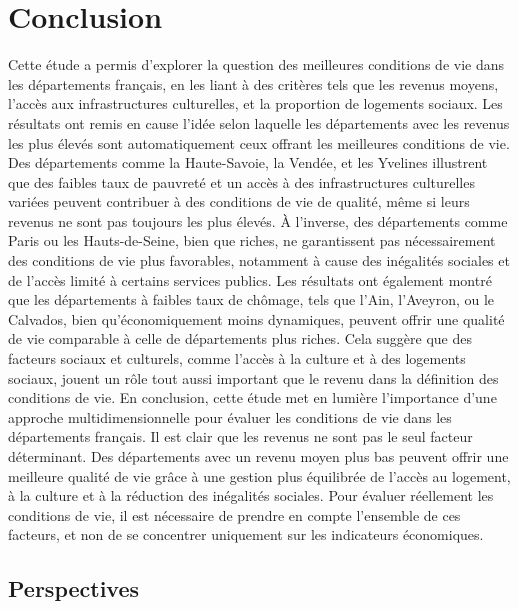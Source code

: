 \documentclass[mstat,12pt]{unswthesis}
\begin{document}
\bigskip

\chapter{Conclusion}\label{conclusion}

Cette étude a permis d'explorer la question des meilleures conditions de
vie dans les départements français, en les liant à des critères tels que
les revenus moyens, l'accès aux infrastructures culturelles, et la
proportion de logements sociaux. Les résultats ont remis en cause l'idée
selon laquelle les départements avec les revenus les plus élevés sont
automatiquement ceux offrant les meilleures conditions de vie. \medskip
Des départements comme la Haute-Savoie, la Vendée, et les Yvelines
illustrent que des faibles taux de pauvreté et un accès à des
infrastructures culturelles variées peuvent contribuer à des conditions
de vie de qualité, même si leurs revenus ne sont pas toujours les plus
élevés. À l'inverse, des départements comme Paris ou les Hauts-de-Seine,
bien que riches, ne garantissent pas nécessairement des conditions de
vie plus favorables, notamment à cause des inégalités sociales et de
l'accès limité à certains services publics. \medskip Les résultats ont
également montré que les départements à faibles taux de chômage, tels
que l'Ain, l'Aveyron, ou le Calvados, bien qu'économiquement moins
dynamiques, peuvent offrir une qualité de vie comparable à celle de
départements plus riches. Cela suggère que des facteurs sociaux et
culturels, comme l'accès à la culture et à des logements sociaux, jouent
un rôle tout aussi important que le revenu dans la définition des
conditions de vie. \medskip En conclusion, cette étude met en lumière
l'importance d'une approche multidimensionnelle pour évaluer les
conditions de vie dans les départements français. Il est clair que les
revenus ne sont pas le seul facteur déterminant. Des départements avec
un revenu moyen plus bas peuvent offrir une meilleure qualité de vie
grâce à une gestion plus équilibrée de l'accès au logement, à la culture
et à la réduction des inégalités sociales. Pour évaluer réellement les
conditions de vie, il est nécessaire de prendre en compte l'ensemble de
ces facteurs, et non de se concentrer uniquement sur les indicateurs
économiques. \bigskip

\section{Perspectives}\label{perspectives}
\end{document}
